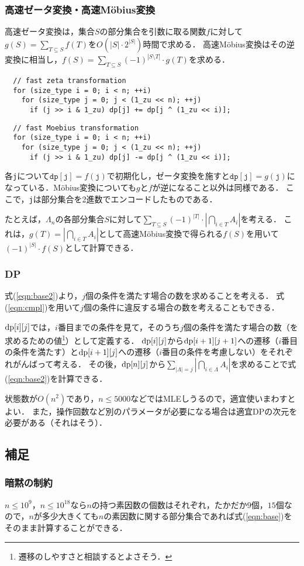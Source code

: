 \documentclass{jsarticle}
\newcommand{\DP}{\ensuremath\mathrm{dp}}
\begin{document}
\subsubsection{高速ゼータ変換・高速M\"obius変換}
高速ゼータ変換は，集合$S$の部分集合を引数に取る関数$f$に対して$g(S)=\sum_{T\subseteq S} f(T)$を$O(|S|\cdot 2^{|S|})$時間で求める．
高速M\"obius変換はその逆変換に相当し，$f(S)=\sum_{T\subseteq S} (-1)^{|S\setminus T|}\cdot g(T)$を求める．
\begin{verbatim}
  // fast zeta transformation
  for (size_type i = 0; i < n; ++i)
    for (size_type j = 0; j < (1_zu << n); ++j)
      if (j >> i & 1_zu) dp[j] += dp[j ^ (1_zu << i)];
\end{verbatim}
\begin{verbatim}
  // fast Moebius transformation
  for (size_type i = 0; i < n; ++i)
    for (size_type j = 0; j < (1_zu << n); ++j)
      if (j >> i & 1_zu) dp[j] -= dp[j ^ (1_zu << i)];
\end{verbatim}
各\texttt{j}について$\mathtt{dp}[\mathtt{j}] = f(\mathtt{j})$で初期化し，ゼータ変換を施すと$\mathtt{dp}[\mathtt{j}] = g(\mathtt{j})$になっている．M\"obius変換についても$g$と$f$が逆になること以外は同様である．
ここで，\texttt{j}は部分集合を2進数でエンコードしたものである．

たとえば，$\Lambda_n$の各部分集合$S$に対して$\sum_{T\subseteq S} (-1)^{|T|}\cdot \left|\bigcap_{i\in T}A_i\right|$を考える．
これは，$g(T) = \left|\bigcap_{i\in T} A_i\right|$として高速M\"obius変換で得られる$f(S)$を用いて$(-1)^{|S|}\cdot f(S)$として計算できる．

\subsubsection{DP}
式(\ref{eqn:base2})より，$j$個の条件を満たす場合の数を求めることを考える．
式(\ref{eqn:cmpl})を用いて$j$個の条件に違反する場合の数を考えることもできる．

$\DP[i][j]$では，$i$番目までの条件を見て，そのうち$j$個の条件を満たす場合の数（を求めるための値\footnote{遷移のしやすさと相談するとよさそう．}）として定義する．
$\DP[i][j]$から$\DP[i+1][j+1]$への遷移（$i$番目の条件を満たす）と$\DP[i+1][j]$への遷移（$i$番目の条件を考慮しない）をそれぞれがんばって考える．
その後，$\DP[n][j]$から$\sum_{|\Lambda|=j}\left|\bigcap_{i\in\Lambda} A_i\right|$を求めることで式(\ref{eqn:base2})を計算できる．

状態数が$O(n^2)$であり，$n\le 5000$などではMLEしうるので，適宜使いまわすとよい．
また，操作回数など別のパラメータが必要になる場合は適宜DPの次元を必要がある（それはそう）．

\subsection{補足}
\subsubsection{暗黙の制約}
$n\le 10^9$，$n\le 10^{18}$なら$n$の持つ素因数の個数はそれぞれ，たかだか$9$個，$15$個なので，$n$が多少大きくても$n$の素因数に関する部分集合であれば式(\ref{eqn:base})をそのまま計算することができる．
\end{document}
